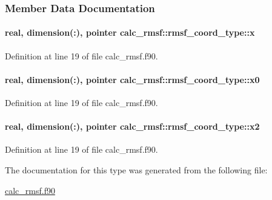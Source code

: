 \subsubsection{Member Data Documentation}
\hypertarget{structcalc__rmsf_1_1rmsf__coord__type_af139832c8b6bd82bf495a1fd670d42fd}{
\paragraph[{x}]{\setlength{\rightskip}{0pt plus 5cm}real, dimension(\-:), pointer calc\-\_\-rmsf\-::rmsf\-\_\-coord\-\_\-type\-::x}}\label{structcalc__rmsf_1_1rmsf__coord__type_af139832c8b6bd82bf495a1fd670d42fd}


Definition at line 19 of file calc\-\_\-rmsf.\-f90.

\hypertarget{structcalc__rmsf_1_1rmsf__coord__type_a1cdd3cfcbbad90682a24378ea57f15db}{
\paragraph[{x0}]{\setlength{\rightskip}{0pt plus 5cm}real, dimension(\-:), pointer calc\-\_\-rmsf\-::rmsf\-\_\-coord\-\_\-type\-::x0}}\label{structcalc__rmsf_1_1rmsf__coord__type_a1cdd3cfcbbad90682a24378ea57f15db}


Definition at line 19 of file calc\-\_\-rmsf.\-f90.

\hypertarget{structcalc__rmsf_1_1rmsf__coord__type_aa6ddd12282b5ef3eee84f8790fd3b719}{
\paragraph[{x2}]{\setlength{\rightskip}{0pt plus 5cm}real, dimension(\-:), pointer calc\-\_\-rmsf\-::rmsf\-\_\-coord\-\_\-type\-::x2}}\label{structcalc__rmsf_1_1rmsf__coord__type_aa6ddd12282b5ef3eee84f8790fd3b719}


Definition at line 19 of file calc\-\_\-rmsf.\-f90.



The documentation for this type was generated from the following file\-:\begin{DoxyCompactItemize}
\item 
\hyperlink{calc__rmsf_8f90}{calc\-\_\-rmsf.\-f90}\end{DoxyCompactItemize}
